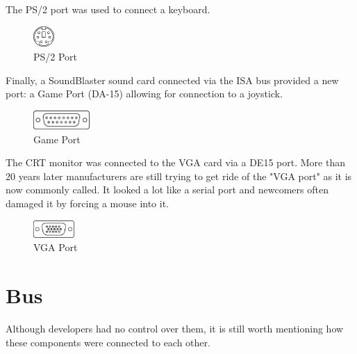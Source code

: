 \documentclass[book.tex]{subfiles}
\begin{document}
The PS/2 port was used to connect a keyboard.
 \begin{figure}[H]
\centering
\includegraphics[width=0.07\textwidth]{imgs/drawings/ports/MiniDIN-6_PS2.eps}
\caption{PS/2 Port}
\label{fig:ps2Port}
\end{figure}


Finally, a SoundBlaster sound card connected via the ISA bus provided a new port: a Game Port (DA-15) allowing for connection to a joystick.
 \begin{figure}[H]
\centering
\includegraphics[width=0.19\textwidth]{imgs/drawings/ports/DA-15_GamePort.eps}
\caption{Game Port}
\label{fig:gamePort}
\end{figure}

 The CRT monitor was connected to the VGA card via a DE15 port. More than 20 years later manufacturers are still trying to get ride of the "VGA port" as it is now commonly called. It looked a lot like a serial port and newcomers often damaged it by forcing a mouse into it.
 \begin{figure}[H]
\centering
\includegraphics[width=0.14\textwidth]{imgs/drawings/DE15_VGA.eps}
\caption{VGA Port}
\label{fig:ps2Port}
\end{figure}


\section{Bus}
Although developers had no control over them, it is still worth mentioning how these components were connected to each other.\\ 
\par
\end{document}
